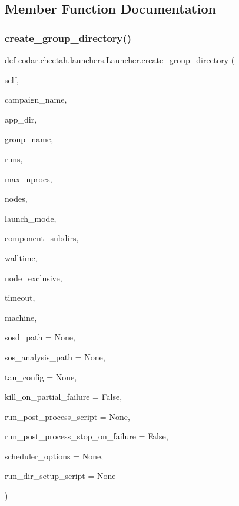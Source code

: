 \subsection{Member Function Documentation}
\mbox{\label{classcodar_1_1cheetah_1_1launchers_1_1_launcher_a961dc12bab6b346c28372995b9873e46}} 
\subsubsection{\texorpdfstring{create\+\_\+group\+\_\+directory()}{create\_group\_directory()}}
{\footnotesize\ttfamily def codar.\+cheetah.\+launchers.\+Launcher.\+create\+\_\+group\+\_\+directory (\begin{DoxyParamCaption}\item[{}]{self,  }\item[{}]{campaign\+\_\+name,  }\item[{}]{app\+\_\+dir,  }\item[{}]{group\+\_\+name,  }\item[{}]{runs,  }\item[{}]{max\+\_\+nprocs,  }\item[{}]{nodes,  }\item[{}]{launch\+\_\+mode,  }\item[{}]{component\+\_\+subdirs,  }\item[{}]{walltime,  }\item[{}]{node\+\_\+exclusive,  }\item[{}]{timeout,  }\item[{}]{machine,  }\item[{}]{sosd\+\_\+path = {\ttfamily None},  }\item[{}]{sos\+\_\+analysis\+\_\+path = {\ttfamily None},  }\item[{}]{tau\+\_\+config = {\ttfamily None},  }\item[{}]{kill\+\_\+on\+\_\+partial\+\_\+failure = {\ttfamily False},  }\item[{}]{run\+\_\+post\+\_\+process\+\_\+script = {\ttfamily None},  }\item[{}]{run\+\_\+post\+\_\+process\+\_\+stop\+\_\+on\+\_\+failure = {\ttfamily False},  }\item[{}]{scheduler\+\_\+options = {\ttfamily None},  }\item[{}]{run\+\_\+dir\+\_\+setup\+\_\+script = {\ttfamily None} }\end{DoxyParamCaption})}

